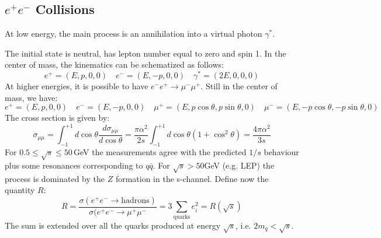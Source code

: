\documentclass[10.75pt,a4paper,openright,bottom=2cm]{article}
\begin{document}
\subsection{$e^+e^-$ Collisions}
At low energy, the main process is an annihilation into a virtual photon $\gamma^*$. 
\begin{center}
\end{center}
The initial state is neutral, has lepton number equal to zero and spin 1. In the center of mass, the kinematics can be schematized as follows:
\[
e^+=(E,p,0,0) \quad e^-=(E,-p,0,0) \quad \gamma^*=(2E,0,0,0)
\]
At higher energies, it is possible to have $e^-e^+\to\mu^-\mu^+$. Still in the center of mass, we have:
\[
e^+=(E,p,0,0) \quad e^-=(E,-p,0,0) \quad \mu^+=(E,p\cos\theta,p\sin\theta,0) \quad \mu^-=(E,-p\cos\theta,-p\sin\theta,0)
\]
The cross section is given by:
\[
\sigma_{\mu\mu}=\int_{-1}^{+1}d\cos\theta\frac{d\sigma_{\mu\mu}}{d\cos\theta}=\frac{\pi\alpha^2}{2s}\int_{-1}^{+1}d\cos\theta(1+\cos^2\theta)=\frac{4\pi\alpha^2}{3s}
\]
For $0.5\le\sqrt{s}\le50$\,GeV the measurements agree with the predicted $1/s$ behaviour plus some resonances corresponding to $q\overline{q}$. For $\sqrt{s}>50$\;GeV (e.g. LEP) the process is dominated by the $Z$ formation in the s-channel. Define now the quantity $R$:
\[
R=\frac{\sigma(e^+e^-\to\text{hadrons})}{\sigma(e^+e^-\to\mu^+\mu^-}=3\sum_{\text{quarks}}e_i^2=R(\sqrt{s})
\]
The sum is extended over all the quarks produced at energy $\sqrt{s}$, i.e. $2m_q<\sqrt{s}$.
\end{document}
